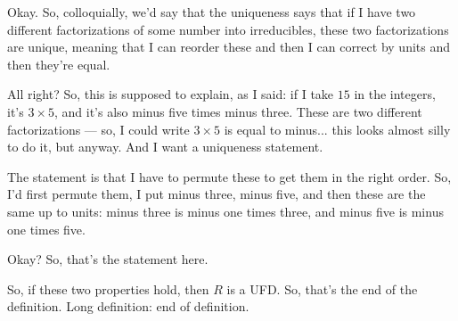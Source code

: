 \begin{speech}[00:14:32 - 00:15:52]
Okay. So, colloquially, we'd say that the uniqueness says that if I have two different factorizations of some number into irreducibles, these two factorizations are unique, meaning that I can reorder these and then I can correct by units and then they're equal.

All right? So, this is supposed to explain, as I said: if I take $15$ in the integers,  it's $3 \times 5$, and it's also minus five  times minus three. These are two different factorizations --- so, I could write $3 \times 5$  is equal to minus... this looks almost silly to do it, but anyway. And I want a uniqueness statement.

The statement is that I have to permute these to get them in the right order. So, I'd first permute them,  I put minus three, minus five, and then these are the same up to units: minus three is minus one times three, and minus five is minus one times five.

Okay? So, that's the statement here.

So, if these two properties hold, then $R$ is a UFD. So, that's the end of the definition. Long definition:  end of definition.
\end{speech}

\begin{content}
\end{content}

